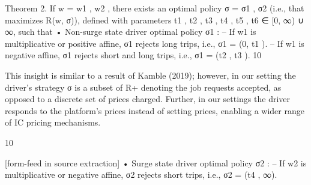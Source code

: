 \documentclass[10pt]{article}
\begin{document}
\begin{ReviewVerbatim}

Theorem 2. If w = {w1 , w2 }, there exists an optimal policy σ = {σ1 , σ2 } (i.e., that maximizes
R(w, σ)), defined with parameters t1 , t2 , t3 , t4 , t5 , t6 ∈ [0, ∞) ∪ {∞}, such that
• Non-surge state driver optimal policy σ1 :
– If w1 is multiplicative or positive affine, σ1 rejects long trips, i.e., σ1 = (0, t1 ).
– If w1 is negative affine, σ1 rejects short and long trips, i.e., σ1 = (t2 , t3 ).
10

This insight is similar to a result of Kamble (2019); however, in our setting the driver’s strategy σ is a subset of
R+ denoting the job requests accepted, as opposed to a discrete set of prices charged. Further, in our settings the
driver responds to the platform’s prices instead of setting prices, enabling a wider range of IC pricing mechanisms.

10


[form-feed in source extraction]
• Surge state driver optimal policy σ2 :
– If w2 is multiplicative or negative affine, σ2 rejects short trips, i.e., σ2 = (t4 , ∞).


\end{ReviewVerbatim}
\end{document}
